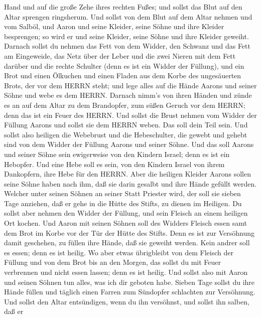 Hand und auf die große Zehe ihres rechten Fußes; und sollst das Blut auf
den Altar sprengen ringsherum.  Und sollst von dem Blut auf
dem Altar nehmen und vom Salböl, und Aaron und seine Kleider, seine
Söhne und ihre Kleider besprengen; so wird er und seine Kleider, seine
Söhne und ihre Kleider geweiht.  Darnach sollst du nehmen
das Fett von dem Widder, den Schwanz und das Fett am Eingeweide, das
Netz über der Leber und die zwei Nieren mit dem Fett darüber und die
rechte Schulter (denn es ist ein Widder der Füllung),  und
ein Brot und einen Ölkuchen und einen Fladen aus dem Korbe des
ungesäuerten Brots, der vor dem HERRN steht;  und lege
alles auf die Hände Aarons und seiner Söhne und webe es dem HERRN.
 Darnach nimm's von ihren Händen und zünde es an auf dem
Altar zu dem Brandopfer, zum süßen Geruch vor dem HERRN; denn das ist
ein Feuer des HERRN.  Und sollst die Brust nehmen vom
Widder der Füllung Aarons und sollst sie dem HERRN weben. Das soll dein
Teil sein.  Und sollst also heiligen die Webebrust und die
Hebeschulter, die gewebt und gehebt sind von dem Widder der Füllung
Aarons und seiner Söhne.  Und das soll Aarons und seiner
Söhne sein ewigerweise von den Kindern Israel; denn es ist ein Hebopfer.
Und eine Hebe soll es sein, von den Kindern Israel von ihrem Dankopfern,
ihre Hebe für den HERRN.  Aber die heiligen Kleider Aarons
sollen seine Söhne haben nach ihm, daß sie darin gesalbt und ihre Hände
gefüllt werden.  Welcher unter seinen Söhnen an seiner
Statt Priester wird, der soll sie sieben Tage anziehen, daß er gehe in
die Hütte des Stifts, zu dienen im Heiligen.  Du sollst
aber nehmen den Widder der Füllung, und sein Fleisch an einem heiligen
Ort kochen.  Und Aaron mit seinen Söhnen soll des Widders
Fleisch essen samt dem Brot im Korbe vor der Tür der Hütte des Stifts.
 Denn es ist zur Versöhnung damit geschehen, zu füllen ihre
Hände, daß sie geweiht werden. Kein andrer soll es essen; denn es ist
heilig.  Wo aber etwas übrigbleibt von dem Fleisch der
Füllung und von dem Brot bis an den Morgen, das sollst du mit Feuer
verbrennen und nicht essen lassen; denn es ist heilig.  Und
sollst also mit Aaron und seinen Söhnen tun alles, was ich dir geboten
habe. Sieben Tage sollst du ihre Hände füllen  und täglich
einen Farren zum Sündopfer schlachten zur Versöhnung. Und sollst den
Altar entsündigen, wenn du ihn versöhnst, und sollst ihn salben, daß er
